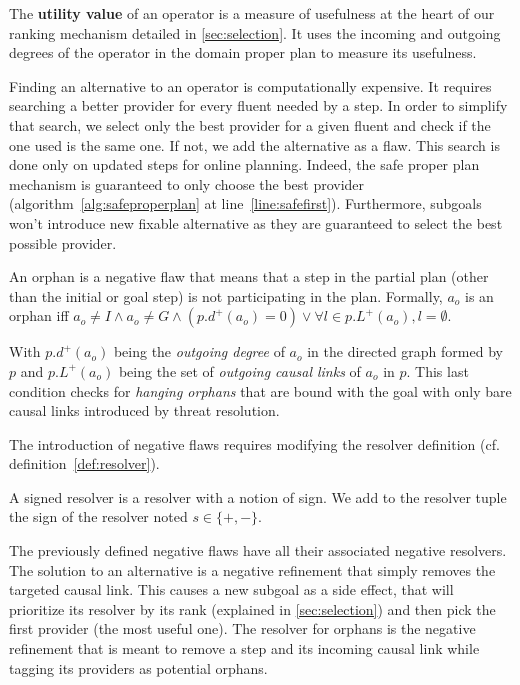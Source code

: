 The \textbf{utility value} of an operator is a measure of usefulness at
the heart of our ranking mechanism detailed in \cref{sec:selection}. It
uses the incoming and outgoing degrees of the operator in the domain
proper plan to measure its usefulness.

Finding an alternative to an operator is computationally expensive. It
requires searching a better provider for every fluent needed by a step.
In order to simplify that search, we select only the best provider for a
given fluent and check if the one used is the same one. If not, we add
the alternative as a flaw. This search is done only on updated steps for
online planning. Indeed, the safe proper plan mechanism is guaranteed to
only choose the best provider (algorithm~\ref{alg:safeproperplan} at
line~\ref{line:safefirst}). Furthermore, subgoals won't introduce new
fixable alternative as they are guaranteed to select the best possible
provider.

\begin{definition}[Orphan]

An orphan is a negative flaw that means that a step in the partial plan
(other than the initial or goal step) is not participating in the plan.
Formally, \(a_o\) is an orphan iff
\(a_o \neq I \land a_o \neq G \land \left( p.d^+(a_o) = 0 \right) \lor \forall l \in p.L^+(a_o), l=\emptyset\).

\end{definition}

With \(p.d^+(a_o)\) being the \emph{outgoing degree} of \(a_o\) in the
directed graph formed by \(p\) and \(p.L^+(a_o)\) being the set of
\emph{outgoing causal links} of \(a_o\) in \(p\). This last condition
checks for \emph{hanging orphans} that are bound with the goal with only
bare causal links introduced by threat resolution.

The introduction of negative flaws requires modifying the resolver
definition (cf. definition~\ref{def:resolver}).

\begin{definition}

A signed resolver is a resolver with a notion of sign. We add to the
resolver tuple the sign of the resolver noted \(s \in \{+, -\}\).

\end{definition}

The previously defined negative flaws have all their associated negative
resolvers. The solution to an alternative is a negative refinement that
simply removes the targeted causal link. This causes a new subgoal as a
side effect, that will prioritize its resolver by its rank (explained in
\cref{sec:selection}) and then pick the first provider (the most useful
one). The resolver for orphans is the negative refinement that is meant
to remove a step and its incoming causal link while tagging its
providers as potential orphans.

